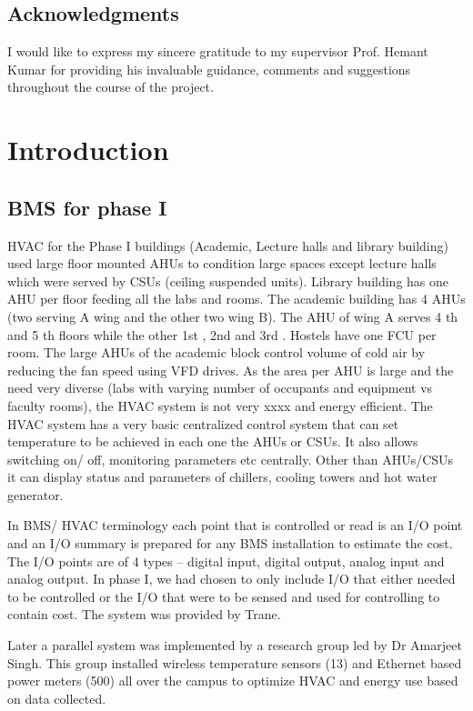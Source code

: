 \documentclass[letterpaper,11pt]{report}
\begin{document}
\newpage
\section*{Acknowledgments}\label{section:acknowledgments}
\pagestyle{plain}

I would like to express my sincere gratitude to my supervisor Prof. Hemant Kumar for providing his invaluable guidance, comments and suggestions throughout the course of the project. 

\vspace{2in}

\newpage

\tableofcontents

\chapter{Introduction}\label{chapter:introduction}
\setcounter{page}{1}
\onehalfspacing
\section{BMS for phase I}
HVAC for the Phase I buildings (Academic, Lecture halls and library building) used large floor mounted AHUs to condition large spaces except lecture halls which were served by CSUs (ceiling suspended units). Library building has one AHU per floor feeding all the labs and rooms. The academic building has 4 AHUs (two serving A wing and the other two wing B). The AHU of wing A serves 4 th and 5 th floors while the other 1st , 2nd and 3rd . Hostels have one FCU per room. The large AHUs of the academic block control volume of cold air by reducing the fan speed using VFD drives. As the area per AHU is large and the need very diverse (labs with varying number of occupants and equipment vs faculty rooms), the HVAC system is not very xxxx and energy efficient. The HVAC system has a very basic centralized control system that can set temperature to be achieved in each one the AHUs or CSUs. It also allows switching on/ off, monitoring parameters etc centrally. Other than AHUs/CSUs it can display status and parameters of chillers, cooling towers and hot water generator.
\par
In BMS/ HVAC terminology each point that is controlled or read is an I/O point and an I/O summary is prepared for any BMS installation to estimate the cost. The I/O points are of 4 types –  digital input, digital output, analog input and analog output. In phase I, we had chosen to only include I/O that either needed to be controlled or the I/O that were to be sensed and used for controlling to contain cost. The system was provided by Trane.
\par
Later a parallel system was implemented by a research group led by Dr Amarjeet Singh. This group installed wireless temperature sensors (13) and Ethernet based power meters (500) all over the campus to optimize HVAC and energy use based on data collected.
\pagebreak
\end{document}
